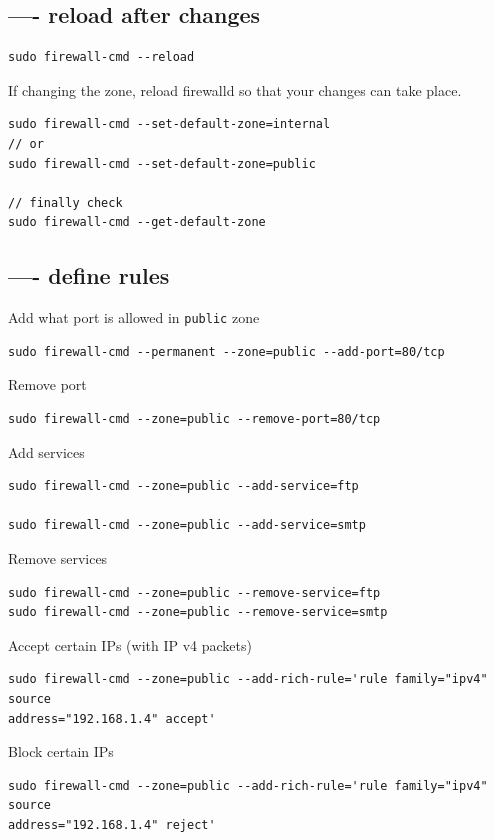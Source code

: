 \subsection{---- reload after changes}

\begin{verbatim}
sudo firewall-cmd --reload
\end{verbatim}

If changing the zone, reload firewalld so that your changes can take place.
\begin{verbatim}
sudo firewall-cmd --set-default-zone=internal
// or
sudo firewall-cmd --set-default-zone=public

// finally check
sudo firewall-cmd --get-default-zone
\end{verbatim}

\subsection{---- define rules}


Add what port is allowed in \verb!public! zone
\begin{verbatim}
sudo firewall-cmd --permanent --zone=public --add-port=80/tcp
\end{verbatim}

Remove port
\begin{verbatim}
sudo firewall-cmd --zone=public --remove-port=80/tcp
\end{verbatim}

Add services
\begin{verbatim}
sudo firewall-cmd --zone=public --add-service=ftp

sudo firewall-cmd --zone=public --add-service=smtp
\end{verbatim}

Remove services
\begin{verbatim}
sudo firewall-cmd --zone=public --remove-service=ftp
sudo firewall-cmd --zone=public --remove-service=smtp
\end{verbatim}

Accept certain IPs (with IP v4 packets)
\begin{verbatim}
sudo firewall-cmd --zone=public --add-rich-rule='rule family="ipv4" source
address="192.168.1.4" accept'
\end{verbatim}

Block certain IPs
\begin{verbatim}	
sudo firewall-cmd --zone=public --add-rich-rule='rule family="ipv4" source
address="192.168.1.4" reject'
\end{verbatim}

